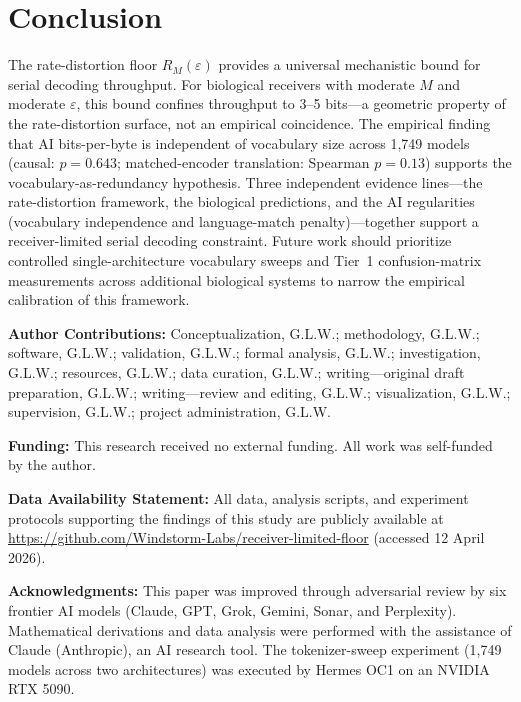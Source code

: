 \documentclass[11pt]{article}
\begin{document}
\section{Conclusion}

The rate-distortion floor $R_M(\varepsilon)$ provides a universal mechanistic bound for serial decoding throughput. For biological receivers with moderate $M$ and moderate $\varepsilon$, this bound confines throughput to 3--5 bits---a geometric property of the rate-distortion surface, not an empirical coincidence. The empirical finding that AI bits-per-byte is independent of vocabulary size across 1,749 models (causal: $p = 0.643$; matched-encoder translation: Spearman $p = 0.13$) supports the vocabulary-as-redundancy hypothesis. Three independent evidence lines---the rate-distortion framework, the biological predictions, and the AI regularities (vocabulary independence and language-match penalty)---together support a receiver-limited serial decoding constraint. Future work should prioritize controlled single-architecture vocabulary sweeps and Tier~1 confusion-matrix measurements across additional biological systems to narrow the empirical calibration of this framework.

\vspace{1em}
\noindent\textbf{Author Contributions:} Conceptualization, G.L.W.; methodology, G.L.W.; software, G.L.W.; validation, G.L.W.; formal analysis, G.L.W.; investigation, G.L.W.; resources, G.L.W.; data curation, G.L.W.; writing---original draft preparation, G.L.W.; writing---review and editing, G.L.W.; visualization, G.L.W.; supervision, G.L.W.; project administration, G.L.W.

\noindent\textbf{Funding:} This research received no external funding. All work was self-funded by the author.

\noindent\textbf{Data Availability Statement:} All data, analysis scripts, and experiment protocols supporting the findings of this study are publicly available at \url{https://github.com/Windstorm-Labs/receiver-limited-floor} (accessed 12 April 2026).

\noindent\textbf{Acknowledgments:} This paper was improved through adversarial review by six frontier AI models (Claude, GPT, Grok, Gemini, Sonar, and Perplexity). Mathematical derivations and data analysis were performed with the assistance of Claude (Anthropic), an AI research tool. The tokenizer-sweep experiment (1,749 models across two architectures) was executed by Hermes OC1 on an NVIDIA RTX 5090.
\end{document}
